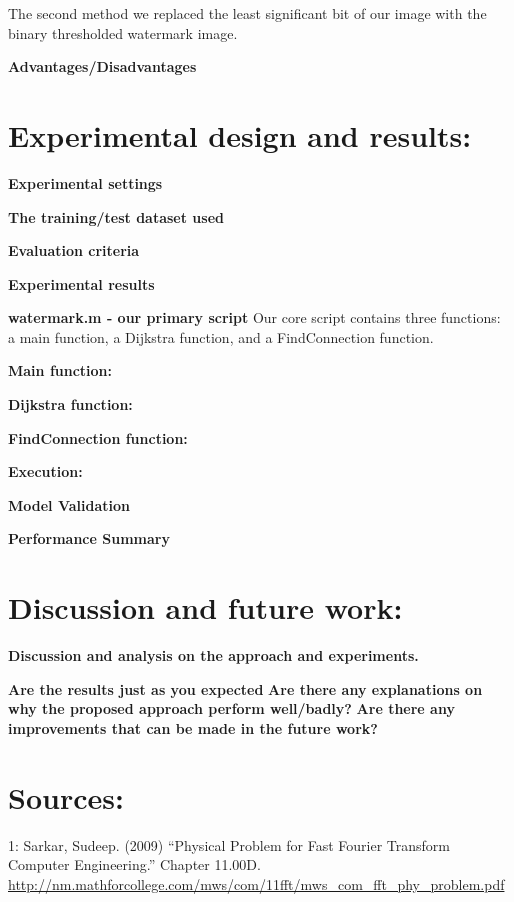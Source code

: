 \documentclass[]{article}
\begin{document}
The second method we replaced the least significant bit of our image
with the binary thresholded watermark image.

\textbf{Advantages/Disadvantages}

\hypertarget{experimental-design-and-results}{%
\section{Experimental design and
results:}\label{experimental-design-and-results}}

\textbf{Experimental settings}

\textbf{The training/test dataset used}

\textbf{Evaluation criteria}

\textbf{Experimental results}

\textbf{watermark.m - our primary script } Our core script contains
three functions: a main function, a Dijkstra function, and a
FindConnection function.

\textbf{Main function: }

\textbf{Dijkstra function: }

\textbf{FindConnection function: }

\textbf{Execution: }

\textbf{Model Validation}

\textbf{Performance Summary}

\hypertarget{discussion-and-future-work}{%
\section{Discussion and future work:}\label{discussion-and-future-work}}

\textbf{Discussion and analysis on the approach and experiments.}

\textbf{Are the results just as you expected} \textbf{Are there any
explanations on why the proposed approach perform well/badly?}
\textbf{Are there any improvements that can be made in the future work?}

\hypertarget{sources}{%
\section{Sources:}\label{sources}}

1: Sarkar, Sudeep. (2009) ``Physical Problem for Fast Fourier Transform
Computer Engineering.'' Chapter 11.00D.
\url{http://nm.mathforcollege.com/mws/com/11fft/mws_com_fft_phy_problem.pdf}
\end{document}
